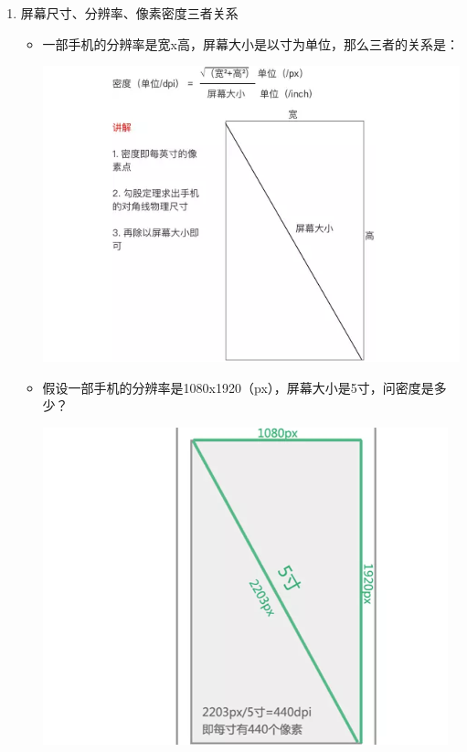 \documentclass[9pt, b5paper]{article}
\begin{document}
\begin{enumerate}
\item 屏幕尺寸、分辨率、像素密度三者关系
\label{sec-6-4-3-1}
\begin{itemize}
\item 一部手机的分辨率是宽x高，屏幕大小是以寸为单位，那么三者的关系是：

\includegraphics[width=.9\linewidth]{./pic/density2.png}

\item 假设一部手机的分辨率是1080x1920（px），屏幕大小是5寸，问密度是多少？

\includegraphics[width=.9\linewidth]{./pic/density3.png}
\end{itemize}
\end{enumerate}
\end{document}
